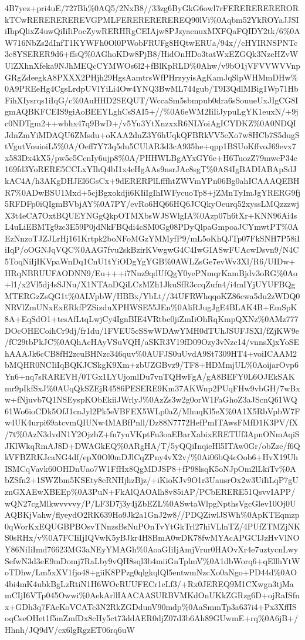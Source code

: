 \documentclass[]{article}
\begin{document}
4B7yez+pri4uE/727Bh\%0AQ5/2NxB8//33zg6ByGkG6owl7rFERERERERERORkTCwREREREREREVGPMLFEREREREREREQ90lVi\%0Aqbm52YkROYaJJSIiIhpQlixZ4uwQiIiIiPocZywRERHRgCEIAjw8PJzyaenuxMXFQaFQIDY2tk/6\%0AW716NbZs2dInfT1KYWFh0Ol0PWobFRUFg8HQtwERUa/94x//cHYIRNSPNTc3c8YSERER9d6+ffsQ\%0AGhoKDw8PjB8/HidOnHDo3tatWxEZGQk3NzeHZvWUlZXhnXfeka9NJhMEQcCYMWOs6l2+fBlKpRLD\%0Ahw/v9bO1jVFVVWVVnpGRgZdeegkA8PXXX2PHjh29HgsAamtrsWfPHrzyyisAgKamJqSlpWHMmDHw\%0A9PREeHg4CgsLrdpUVlYiLi4Ow4YNQ3BwML744gub/T9I3QdlMBig1Wp71HbFihXIysrqs1iIqG/c\%0AuHHD2SEQUT/WccaSm5sbmpub0dra6sSouueUxJIgCG8IgmAQBKFCEIS9giAoBEEYLghCsSAI5+//\%0A6eWM2IiIiJypuLgYK1euxN/+9jc0NDTgm2++wbhx47q9BwD+/v5Yu3YtXnzxxR6NLYoiAgICYDKZ\%0A0NDQIJdnZmYiMDAQU6ZMsdu+oKAA2dnZ3Y6hUqkQFBRkVV5eXo7w8HCb7S5dugStVgutVouioiL5\%0A/Oeff7Y73q5du5CUlAR3d3cA935he+qpp1BSUoKffvoJ69evx7x583Dx4kX5/pw5c5CcnIy6ujp8\%0A/PHHWLBgAYxGY6e+H6TuozZ79mwcP34c169fd3YoRERE5CCLxYIhQ4bI1x4eHgAAs9nsrJAc8sgT\%0AS4IgBADIABApSdJkAC4A/h3AKgDHJEl6GsCx+9dERERPlLfffhtZWVmYPn06Bg0ahICAAAQEBHR7\%0ADwBSU1Mxd+5cjBgxokdji6KIiIgIhIWFycuoTp8+jZMnTyImJgYRERG9fj5RFDFp0iQIgmBVbjAY\%0A7PY/evRo6HQ66HQ6JCQkyOeurq52xyssLMQzzzwjX3t4eCA7OxtBQUEYNGgQkpOTMXbsWJSWlgIA\%0Azp07h6tXr+KNN96Ai4sL4uLiEBMTg9zc3E59P0jdNkFBQdi4cSM0Gg08PDyQlpaGmpoaJCYmwtPT\%0AEzNnzoTJZJLrHj161Krtpk2boNFoMGzYMMyfP9/mL5oKhQJTp07FkSNH7P58iIiIqP/oOGNJqVQC\%0AAG7fvu2skBzirKVwgwG4C4IwGIASwFUAcwDsvn9/N4C5ToqNiIjIKVpaWnDq1CnU1tYiODgYgYGB\%0AWLZsGe7evWv3Xl/R6/UIDw+HRqNBRUUFAODNN9/Eu+++i7Nnz9qdUfQgY0yePNmqrKamBjdv3oRG\%0Ao+l1/x2Vl5dj4sSJNu/X1NTAaDQiLCzMZh1JkuSfR3ccqZufn4/i4mIYjUYUFBQgMTERGzZsQG1t\%0ALVpbW/HBBx/YbLt//34UFRWhqqoKZ86cwa5du2zWDQ0NRVlZmUNxExERkfPZSizduXPHWSE55JEn\%0AliRJugJgE4BLAK4B+EmSpK8A+EqSdO1+tesAfLtqLwjCy4IgnBIE4VRtbe0jiZmIiOhRqKmpQXNz\%0AMz777DOcOHECoihCr9dj/fr1du/1FVEU5cSSwWDAwYMH0dTUhJSUFJSXl/fZjKW9e/fC29tbPkJC\%0AQhAcHAyVSuVQH/aSKR3V19fD09Ozy3vNzc14/vnnsXjxYoSEhAAAJk6cCB8fH2zcuBHNzc346quv\%0AUFJS0uUvdA9St7309HT4+voiICAAM2bMQHR0NCIiIqBQKJCSkgK9Xm+zbUZGBvz9/TF8+HDMmjUL\%0AoijarOvp6Yn6+nq7sRAREVH/0TGx1LYUjomlDu7vnTQHwFgA/gA8BEFY0L6OJEkSAKmr9pIkfSxJ\%0AUqQkSZEjR4586PESERE9Km37AKWnp2PUqFHw9vbGH/7wBxw+fNjuvb7Q1NSEyspKObEkiiJWrlyJ\%0AzZs3w2g0orW1FaGhoZ3aJScnQ61WQ61Wo6ioCDk5OfJ1cnJyl2Pk5eVBFEX5WLp0aZ/MhuqKl5eX\%0A1X5RbVpbW7Fw4UK4urpi69atcvmQIUNw4MABfPnll/Dz88N7772HefPmITAwsFMfD1K3PV/fX/7t\%0AzN3dvdN1Y2OjzbZ+fn7yuVKptFu3oaEBarXabixERETUf3ApnONmAqiSJKlWkqRmAJ8D+DWAGkEQ\%0ARgHA/T/5yQQiInqieHl5ITAw0Gr/obZze/f6QkVFBZRKJcaNG4df/epX0Ol0mDJlCqZPny4vX2v/\%0Ai06bQ4cOob6+HvX19UhISMCqVavk60OHDnUao7W1FfHx8QgMDJSP8+fP98lsqK5oNJpOm2lLkiTv\%0AbZSfn2+1SWZbm5KSEty8eRNHjhzBjz/+iKioKJv9O1r3UausrOx2w3UiIiLqP7gUznGXAEwXBEEp\%0A3PuN+FkAlQAOAlh8v85iAP/PCbERERE51QsvvIAPP/wQN27cgMlkwvvvvy/P/LF3D7j3y4jZbEZL\%0ASwtaWlpgNpthsVgcGlev10Oj0UAQBKjVahw/flyeydO2RK639Ho9Jk2a1GnJ2w8//PDQZiwlJSWh\%0ApKTEqmzp0qWorKxEQUGBPBOsvTNnzsBsNuPOnTvYtGkTrl27hiVLlnTZ/4PUfZTMZjNKS0sRHx/v\%0A7FCIiIjIQVwK5yBJkr4H8BmA0wDK78fwMYAcAPGCIJzHvVlNOY86NiIiImd76623MG3aNEyYMAGh\%0AoaGIiIjAmjVrur0HAOvXr4e7uztycnLwySefwN3d3eE9mDomj7RaLby9vQH8sql3b4miiGnTplmV\%0A1dbWorq6+qEllhYtWoTDhw/Lm5xXV1fjo48+giiK8PPzg0qlgkqlQl5entwmNzcXo0aNgo+PD44d\%0AO4bi4mK4ubkBgLzRtiN1H6WOcRUUFECr1cLf3/+Rx0JEREQ9M1CXwgn3tjMamCIjI6VTp045Owwi\%0AekArllIAACAASURBVMKdOnUKkZGRzg6D+ojRaISfnx+GDh3q7FAeKoVCATc3N2RkZGDdunV90mdp\%0AaSmmTp3a637i4+Px3XffISoqCseOHet1f5mZmfDx8cHy5ct73ddAER0djZ07d3b6Ah89GUwmE+rq\%0A6jB+/Hhnh/JQ9dV/cx6lgRgzET06rq6uW
\end{document}
